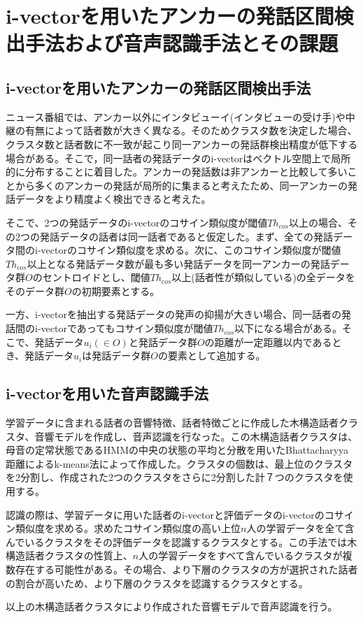 \chapter{i-vectorを用いたアンカーの発話区間検出手法および音声認識手法とその課題}

\section{i-vectorを用いたアンカーの発話区間検出手法\cite{nozaki_gakuseikai}}
\label{section:clustering}
ニュース番組では、アンカー以外にインタビューイ(インタビューの受け手)や中継の有無によって話者数が大きく異なる。そのためクラスタ数を決定した場合、クラスタ数と話者数に不一致が起こり同一アンカーの発話群検出精度が低下する場合がある。そこで，同一話者の発話データのi-vectorはベクトル空間上で局所的に分布することに着目した。アンカーの発話数は非アンカーと比較して多いことから多くのアンカーの発話が局所的に集まると考えたため、同一アンカーの発話データをより精度よく検出できると考えた。\par
そこで、2つの発話データのi-vectorのコサイン類似度が閾値$Th_{cos}$以上の場合、その2つの発話データの話者は同一話者であると仮定した。まず、全ての発話データ間のi-vectorのコサイン類似度を求める。次に、このコサイン類似度が閾値$Th_{cos}$以上となる発話データ数が最も多い発話データを同一アンカーの発話データ群$O$のセントロイドとし、閾値$Th_{cos}$以上(話者性が類似している)の全データをそのデータ群$O$の初期要素とする。\par
一方、i-vectorを抽出する発話データの発声の抑揚が大きい場合、同一話者の発話間のi-vectorであってもコサイン類似度が閾値$Th_{cos}$以下になる場合がある。そこで、発話データ$u_i(\in O)$と発話データ群$O$の距離が一定距離以内であるとき、発話データ$u_i$は発話データ群$O$の要素として追加する。\par

\section{i-vectorを用いた音声認識手法\cite{yoshimura_clustering}}
\label{section:yoshimura_pre_clustering}
学習データに含まれる話者の音響特徴、話者特徴ごとに作成した木構造話者クラスタ、音響モデルを作成し、音声認識を行なった。この木構造話者クラスタは、母音の定常状態であるHMMの中央の状態の平均と分散を用いたBhattacharyya距離によるk-means法によって作成した。クラスタの個数は、最上位のクラスタを2分割し、作成された2つのクラスタをさらに2分割した計７つのクラスタを使用する。\par
認識の際は、学習データに用いた話者のi-vectorと評価データのi-vectorのコサイン類似度を求める。求めたコサイン類似度の高い上位$n$人の学習データを全て含んでいるクラスタをその評価データを認識するクラスタとする。この手法では木構造話者クラスタの性質上、$n$人の学習データをすべて含んでいるクラスタが複数存在する可能性がある。その場合、より下層のクラスタの方が選択された話者の割合が高いため、より下層のクラスタを認識するクラスタとする。\par
以上の木構造話者クラスタにより作成された音響モデルで音声認識を行う。


